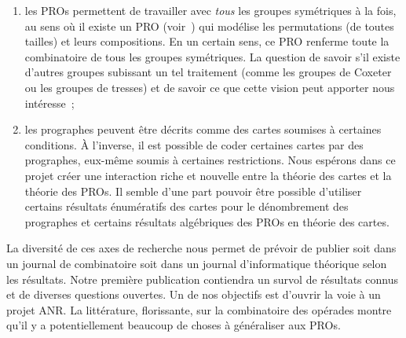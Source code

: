 \documentclass[10pt,reqno]{amsart}
\numberwithin{equation}{subsection}
\begin{document}
\begin{enumerate}[fullwidth,label={\bf (\arabic*)}]
    \item \label{item:objectif_groupes}
    les PROs permettent de travailler avec {\em tous} les groupes 
    symétriques à la fois, au sens où il existe un PRO 
    (voir~\cite{Laf03,Laf13}) qui modélise les permutations (de toutes 
    tailles) et leurs compositions. En un certain sens, ce PRO renferme
    toute la combinatoire de tous  les groupes symétriques. La question 
    de savoir s'il existe d'autres groupes subissant un tel traitement
    (comme les groupes de Coxeter ou les groupes de tresses) et de 
    savoir ce que cette vision peut apporter nous intéresse~;
    
    \item \label{item:objectif_cartes}
    les prographes peuvent être décrits comme des cartes soumises à 
    certaines conditions. À l'inverse, il est possible de coder certaines
    cartes par des prographes, eux-même soumis à certaines restrictions.
    Nous espérons dans ce projet créer une interaction riche et nouvelle 
    entre la théorie des cartes et la théorie des PROs. Il semble d'une 
    part pouvoir être possible d'utiliser certains résultats énumératifs 
    des cartes pour le dénombrement des prographes et certains résultats 
    algébriques des PROs en théorie des cartes.
\end{enumerate}



La diversité de ces axes de recherche nous permet de prévoir de publier 
soit dans un journal de combinatoire soit dans un journal d'informatique
théorique selon les résultats. Notre première publication contiendra un 
survol de résultats connus et de diverses questions ouvertes. Un de nos
objectifs est d'ouvrir la voie à un projet ANR. La littérature, 
florissante, sur la combinatoire des opérades montre qu'il y a 
potentiellement beaucoup de choses à généraliser aux PROs.

\end{document}
